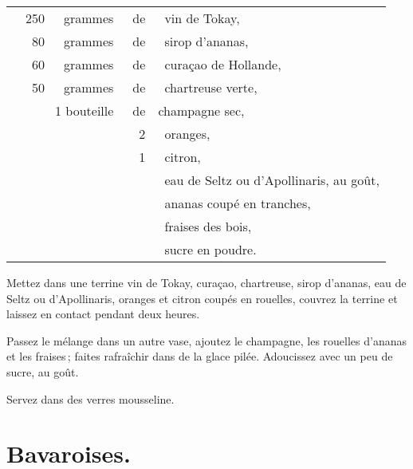 \footnotesize
\begin{longtable}{rrrrp{16em}}
  & 250 & grammes & de & vin de Tokay,                                                                    \\
  &  80 & grammes & de & sirop d'ananas,                                                                  \\
  &  60 & grammes & de & curaçao de Hollande,                                                             \\
  &  50 & grammes & de & chartreuse verte,                                                                \\
  & \multicolumn{2}{r}{1 bouteille} & de & champagne sec,                                                 \\
  &     &         &  2 & oranges,                                                                         \\
  &     &         &  1 & citron,                                                                          \\
  &     &         &    & eau de Seltz ou d’Apollinaris, au goût,                                          \\
  &     &         &    & ananas coupé en tranches,                                                        \\
  &     &         &    & fraises des bois,                                                                \\
  &     &         &    & sucre en poudre.                                                                 \\
\end{longtable}
\normalsize

Mettez dans une terrine vin de Tokay, curaçao, chartreuse, sirop d'ananas, eau
de Seltz ou d'Apollinaris, oranges et citron coupés en rouelles, couvrez la
terrine et laissez en contact pendant deux heures.

Passez le mélange dans un autre vase, ajoutez le champagne, les rouelles
d'ananas et les fraises ; faites rafraîchir dans de la glace pilée. Adoucissez
avec un peu de sucre, au goût.

Servez dans des verres mousseline.

\section*{\centering Bavaroises.}
{}



